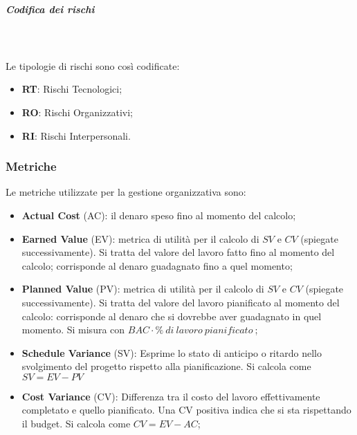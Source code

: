 			\noindent
			\subparagraph{Codifica dei rischi} \mbox{}\\ \mbox{}\\
				Le tipologie di rischi sono così codificate:
				\begin{itemize}
					\item \textbf{RT}: Rischi Tecnologici;
					\item \textbf{RO}: Rischi Organizzativi;
					\item \textbf{RI}: Rischi Interpersonali.
				\end{itemize}

		\subsubsection{Metriche}
		Le metriche utilizzate per la gestione organizzativa sono:
		\begin{itemize}
			\item \textbf{Actual Cost} (AC): il denaro speso fino al momento del calcolo;
			\item \textbf{Earned Value} (EV): metrica di utilità per il calcolo di $SV$ e $CV$ (spiegate successivamente). Si tratta del valore del lavoro fatto fino al momento del calcolo; corrisponde al denaro guadagnato fino a quel momento;
			\item \textbf{Planned Value} (PV): metrica di utilità per il calcolo di $SV$ e $CV$ (spiegate successivamente). Si tratta del valore del lavoro pianificato al momento del calcolo: corrisponde al denaro che si dovrebbe aver guadagnato in quel momento. Si misura con $BAC \cdot \%\ di\ lavoro\ pianificato\ $;
			\item \textbf{Schedule Variance} (SV): Esprime lo stato di anticipo o ritardo nello svolgimento del progetto rispetto alla pianificazione. Si calcola come $SV = EV - PV$
			\item \textbf{Cost Variance} (CV): Differenza tra il costo del lavoro effettivamente completato e quello
			pianificato. Una CV positiva indica che si sta rispettando il budget. Si calcola come $CV = EV - AC$;
		\end{itemize}

